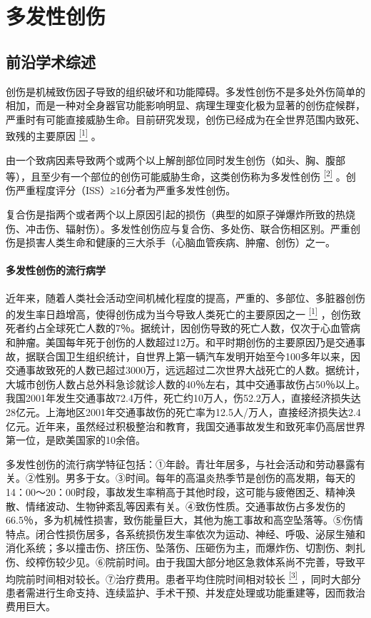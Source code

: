 \chapter{多发性创伤}

\section{前沿学术综述}

创伤是机械致伤因子导致的组织破坏和功能障碍。多发性创伤不是多处外伤简单的相加，而是一种对全身器官功能影响明显、病理生理变化极为显著的创伤症候群，严重时有可能直接威胁生命。目前研究发现，创伤已经成为在全世界范围内致死、致残的主要原因
\protect\hyperlink{text00024.htmlux5cux23ch1-23}{\textsuperscript{{[}1{]}}}
。

由一个致病因素导致两个或两个以上解剖部位同时发生创伤（如头、胸、腹部等），且至少有一个部位的创伤可能威胁生命，这类创伤称为多发性创伤
\protect\hyperlink{text00024.htmlux5cux23ch2-23}{\textsuperscript{{[}2{]}}}
。创伤严重程度评分（ISS）≥16分者为严重多发性创伤。

复合伤是指两个或者两个以上原因引起的损伤（典型的如原子弹爆炸所致的热烧伤、冲击伤、辐射伤）。多发性创伤应与复合伤、多处伤、联合伤相区别。严重创伤是损害人类生命和健康的三大杀手（心脑血管疾病、肿瘤、创伤）之一。

\subsubsection{多发性创伤的流行病学}

近年来，随着人类社会活动空间机械化程度的提高，严重的、多部位、多脏器创伤的发生率日趋增高，使得创伤成为当今导致人类死亡的主要原因之一
\protect\hyperlink{text00024.htmlux5cux23ch1-23}{\textsuperscript{{[}1{]}}}
，创伤致死者约占全球死亡人数的7％。据统计，因创伤导致的死亡人数，仅次于心血管病和肿瘤。美国每年死于创伤的人数超过12万。和平时期创伤的主要原因乃是交通事故，据联合国卫生组织统计，自世界上第一辆汽车发明开始至今100多年以来，因交通事故致死的人数已超过3000万，远远超过二次世界大战死亡的人数。据统计，大城市创伤人数占总外科急诊就诊人数的40％左右，其中交通事故伤占50％以上。我国2001年发生交通事故72.4万件，死亡约10万人，伤52.2万人，直接经济损失达28亿元。上海地区2001年交通事故伤的死亡率为12.5人/万人，直接经济损失达2.4亿元。近年来，虽然经过积极整治和教育，我国交通事故发生和致死率仍高居世界第一位，是欧美国家的10余倍。

多发性创伤的流行病学特征包括：①年龄。青壮年居多，与社会活动和劳动暴露有关。②性别。男多于女。③时间。每年的高温炎热季节是创伤的高发期，每天的14：00～20：00时段，事故发生率稍高于其他时段，这可能与疲倦困乏、精神涣散、情绪波动、生物钟紊乱等因素有关。④致伤性质。交通事故伤占多发伤的66.5％，多为机械性损害，致伤能量巨大，其他为施工事故和高空坠落等。⑤伤情特点。闭合性损伤居多，各系统损伤发生率依次为运动、神经、呼吸、泌尿生殖和消化系统；多以撞击伤、挤压伤、坠落伤、压砸伤为主，而爆炸伤、切割伤、刺扎伤、绞榨伤较少见。⑥院前时间。由于我国大部分地区急救体系尚不完善，导致平均院前时间相对较长。⑦治疗费用。患者平均住院时间相对较长
\protect\hyperlink{text00024.htmlux5cux23ch3-23}{\textsuperscript{{[}3{]}}}
，同时大部分患者需进行生命支持、连续监护、手术干预、并发症处理或功能重建等，因而救治费用巨大。

